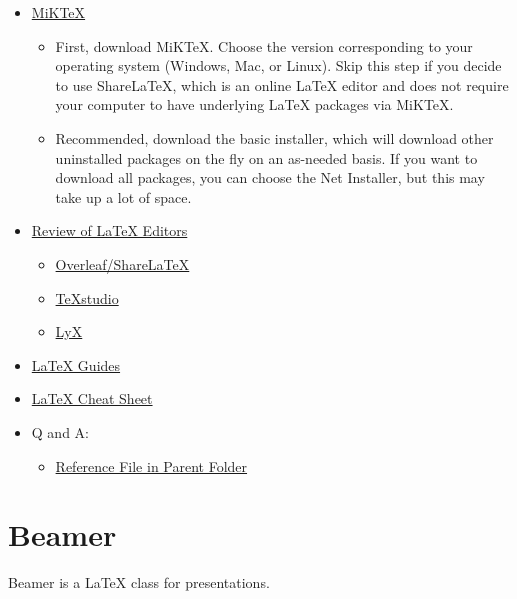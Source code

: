 \documentclass[]{book}
\providecommand{\tightlist}{%
  \setlength{\itemsep}{0pt}\setlength{\parskip}{0pt}}
\begin{document}
\begin{itemize}
\item
  \href{https://miktex.org/download}{MiKTeX}

  \begin{itemize}
  \tightlist
  \item
    First, download MiKTeX. Choose the version corresponding to your operating system (Windows, Mac, or Linux). Skip this step if you decide to use ShareLaTeX, which is an online LaTeX editor and does not require your computer to have underlying LaTeX packages via MiKTeX.
  \item
    Recommended, download the basic installer, which will download other uninstalled packages on the fly on an as-needed basis. If you want to download all packages, you can choose the Net Installer, but this may take up a lot of space.
  \end{itemize}
\item
  \href{https://blog.typeset.io/the-only-latex-editor-guide-youll-need-in-2018-e63868fae027}{Review of LaTeX Editors}

  \begin{itemize}
  \tightlist
  \item
    \href{https://www.overleaf.com/}{Overleaf/ShareLaTeX}
  \item
    \href{https://www.texstudio.org/}{TeXstudio}
  \item
    \href{https://www.lyx.org/}{LyX}
  \end{itemize}
\item
  \href{https://guides.library.harvard.edu/overleaf/latex}{LaTeX Guides}
\item
  \href{https://www.nyu.edu/projects/beber/files/Chang_LaTeX_sheet.pdf}{LaTeX Cheat Sheet}
\item
  Q and A:

  \begin{itemize}
  \tightlist
  \item
    \href{https://tex.stackexchange.com/questions/29172/link-to-file-in-the-parent-folder}{Reference File in Parent Folder}
  \end{itemize}
\end{itemize}

\hypertarget{beamer}{%
\section{Beamer}\label{beamer}}

Beamer is a LaTeX class for presentations.
\end{document}
